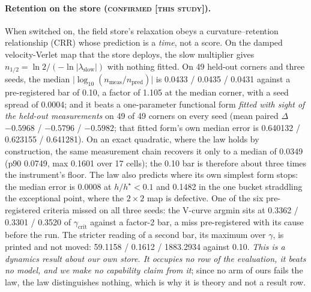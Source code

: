\documentclass{article} %
\begin{document}
\paragraph{Retention on the store (\textsc{confirmed [this study]}).} When switched on, the field
store's relaxation obeys a curvature--retention relationship (CRR) whose prediction is a
\emph{time}, not a score. On the damped velocity-Verlet map that the store deploys, the slow
multiplier gives $n_{1/2}=\ln2/(-\ln\lvert\lambda_{\text{slow}}\rvert)$ with nothing fitted. On 49
held-out corners and three seeds, the median $\lvert\log_{10}(n_{\text{meas}}/n_{\text{pred}})\rvert$ is
0.0433 / 0.0435 / 0.0431 against a pre-registered bar of 0.10, a factor of 1.105 at the median
corner, with a seed spread of 0.0004; and it beats a one-parameter functional form \emph{fitted with sight
of the held-out measurements} on 49 of 49 corners on every seed (mean paired $\Delta$ $-0.5968$ /
$-0.5796$ / $-0.5982$; that fitted form's own median error is 0.640132 / 0.623155 / 0.641281).
On an exact quadratic, where the law holds by construction, the same measurement chain recovers it
only to a median of 0.0349 (p90 0.0749, max 0.1601 over 17 cells); the 0.10 bar is therefore about
three times the instrument's floor. %
The law also predicts where its own simplest form stops: the median error is 0.0008 at $h/h^\star<0.1$
and 0.1482 in the one bucket straddling the exceptional point, where the $2\times2$ map is
defective. %
One of the six pre-registered criteria missed on all three seeds: the V-curve argmin sits at 0.3362 /
0.3301 / 0.3520 of $\gamma_{\text{crit}}$ against a factor-2 bar, a miss pre-registered with its
cause before the run. The stricter reading of a second bar, its maximum over $\gamma$, is
printed and not moved: 59.1158 / 0.1612 / 1883.2934 against 0.10.
\emph{This is a dynamics result about our own store. It occupies no row of the evaluation, it
beats no model, and we make no capability claim from it}; since no arm of ours fails the law, the
law distinguishes nothing, which is why it is theory and not a result row.
\end{document}
